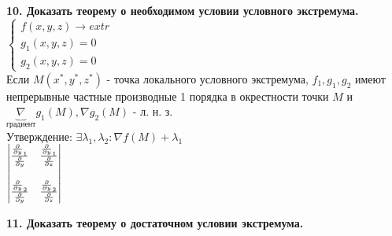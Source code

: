\documentclass[11pt,a4paper]{article}
\newcommand{\pd}{\partialderivative}
\begin{document}
\textbf{10. Доказать теорему о необходимом условии условного экстремума.\\}
$\begin{cases}
    f(x, y, z) \rightarrow extr
    \\
    g_1(x, y, z) = 0
    \\
    g_2(x, y, z) = 0
\end{cases}$
\\
Если $M(x^*, y^*, z^*)$ - точка локального условного экстремума, $f_1, g_1, g_2$ имеют непрерывные частные производные 1 порядка в окрестности точки $M$ и $\underbrace{\nabla}_{\text{градиент}} g_1(M), \nabla g_2(M)$ - л. н. з.
\\
Утверждение: $\exists \lambda_1, \lambda_2: \nabla f(M) + \lambda_1$
\\
$\begin{vmatrix}
    \frac{\pd y_1}{\pd y}&\frac{\pd y_1}{\pd z}
    \\
    \\
    \frac{\pd y_2}{\pd y}&\frac{\pd y_2}{\pd z}
\end{vmatrix}$

\textbf{11. Доказать теорему о достаточном условии экстремума.\\}
\end{document}
